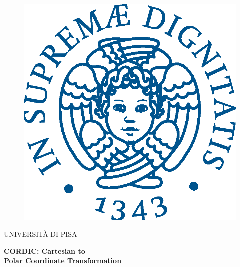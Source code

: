 \begin{titlepage}
\begin{figure}[!htb]

\begin{center}
{
    \includegraphics[keepaspectratio=true,scale=0.5]{images/Frontespizio/cherubinFrontespizio.eps}
}
\end{center}

\end{figure}

\begin{center}
    \LARGE{UNIVERSITÀ DI PISA}
\end{center}

\vspace{15mm}
\begin{center}
    {\LARGE{\bf CORDIC: Cartesian to  \\ \vspace{3mm} Polar Coordinate Transformation }}
\end{center}
\vspace{30mm}

\vfill
\hrulefill
\\

\end{titlepage}
